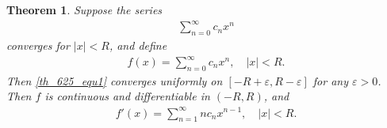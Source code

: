 \documentclass[10pt]{book}
\newtheorem{theorem}{Theorem}[chapter]
\theoremstyle{definition}
\numberwithin{equation}{chapter}
\begin{document}
\begin{theorem}\label{th_625}
Suppose the series
\begin{align}\label{th_625_equ1}
    \sum^\infty_{n=0} c_n x^n
\end{align}
converges for $\left|x\right| < R$, and define
\begin{align}\label{th_625_equ2}
    f(x) = \sum^\infty_{n=0} c_n x^n, \quad \left|x\right| < R.
\end{align}
Then \eqref{th_625_equ1} converges uniformly on $[-R + \varepsilon, R - \varepsilon]$ for any $\varepsilon > 0$. Then $f$ is continuous and differentiable in $(-R,R)$, and
\begin{align}\label{th_625_equ3}
    f'(x) = \sum^\infty_{n=1} n c_n x^{n-1}, \quad \left|x\right| < R.
\end{align}
\end{theorem}
\end{document}
